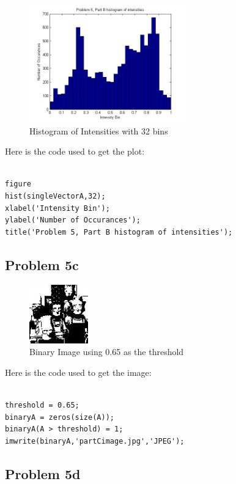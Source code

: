 \documentclass[11pt,psfig]{article}
\begin{document}
\begin{figure}[H]
\centering
\includegraphics[height=2in]{prob5partBplot.jpg}
\caption{Histogram of Intensities with 32 bins}
\end{figure}

Here is the code used to get the plot:

\begin{verbatim}

figure
hist(singleVectorA,32);
xlabel('Intensity Bin');
ylabel('Number of Occurances');
title('Problem 5, Part B histogram of intensities');

\end{verbatim}

\subsection*{Problem 5c}

\begin{figure}[H]
\centering
\includegraphics[height=1in]{partCimage.jpg}
\caption{Binary Image using 0.65 as the threshold}
\end{figure}

Here is the code used to get the image:

\begin{verbatim}

threshold = 0.65;
binaryA = zeros(size(A));
binaryA(A > threshold) = 1;
imwrite(binaryA,'partCimage.jpg','JPEG');

\end{verbatim}

\subsection*{Problem 5d}
\end{document}
